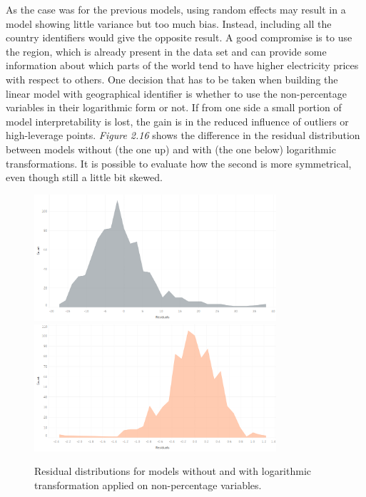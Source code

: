 \documentclass{book}
\begin{document}
As the case was for the previous models, using random effects may result in a model showing little variance but too much bias. Instead, including all the country identifiers would give the opposite result. A good compromise is to use the region, which is already present in the data set and can provide some information about which parts of the world tend to have higher electricity prices with respect to others. One decision that has to be taken when building the linear model with geographical identifier is whether to use the non-percentage variables in their logarithmic form or not. If from one side a small portion of model interpretability is lost, the gain is in the reduced influence of outliers or high-leverage points. \textit{Figure 2.16} shows the difference in the residual distribution between models without (the one up) and with (the one below) logarithmic transformations. It is possible to evaluate how the second is more symmetrical, even though still a little bit skewed.

\bigskip
\begin{figure}[H]
\begin{center}
\captionsetup{justification=centering}
\includegraphics[width=0.8\textwidth]{Images/residualz.png}
\includegraphics[width=0.8\textwidth]{Images/resdislog.png}
\caption{Residual distributions for models without and with logarithmic transformation applied on non-percentage variables.}
\end{center}
\end{figure}
\bigskip
\end{document}

